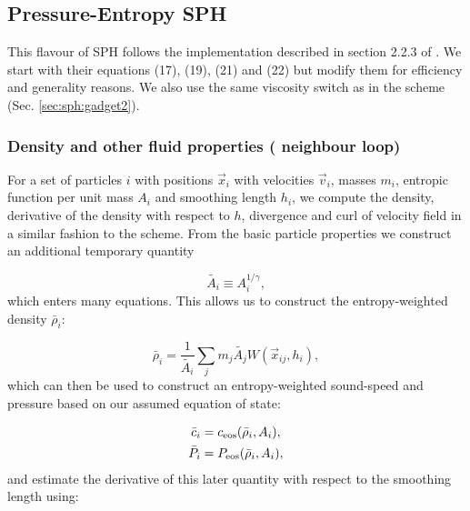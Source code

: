 
\subsection{Pressure-Entropy SPH}
\label{sec:sph:pe}

This flavour of SPH follows the implementation described in section
2.2.3 of \cite{Hopkins2013}. We start with their equations (17), (19),
(21) and (22) but modify them for efficiency and generality
reasons. We also use the same \cite{Balsara1995} viscosity switch as
in the \GadgetSPH scheme (Sec. \ref{sec:sph:gadget2}).

\subsubsection{Density and other fluid properties ( neighbour loop)}

For a set of particles $i$ with positions $\vec{x}_i$ with velocities
$\vec{v}_i$, masses $m_i$, entropic function per unit mass $A_i$ and
smoothing length $h_i$, we compute the density, derivative of the
density with respect to $h$, divergence and curl of velocity field in
a similar fashion to the \GadgetSPH scheme. From the basic particle
properties we construct an additional temporary quantity

\begin{equation}
  \tilde{A_i} \equiv A_i^{1/\gamma},
    \label{eq:sph:pe:A_tilde}
\end{equation}
which enters many equations. This allows us to construct the
entropy-weighted density $\bar\rho_i$:

\begin{equation}
  \bar\rho_i = \frac{1}{\tilde{A_i}} \sum_j m_j \tilde{A_j} W(\vec{x}_{ij}, h_i),
  \label{eq:sph:pe:rho_bar}
\end{equation}
which can then be used to construct an entropy-weighted sound-speed
and pressure based on our assumed equation of state:

\begin{align}
  \bar c_i &= c_{\rm eos}(\bar\rho_i, A_i), \label{eq:sph:pe:c_bar}\\
  \bar P_i &= P_{\rm eos}(\bar\rho_i, A_i), \label{eq:sph:pe:P_bar}
\end{align}
and estimate the derivative of this later quantity with respect to the
smoothing length using:

